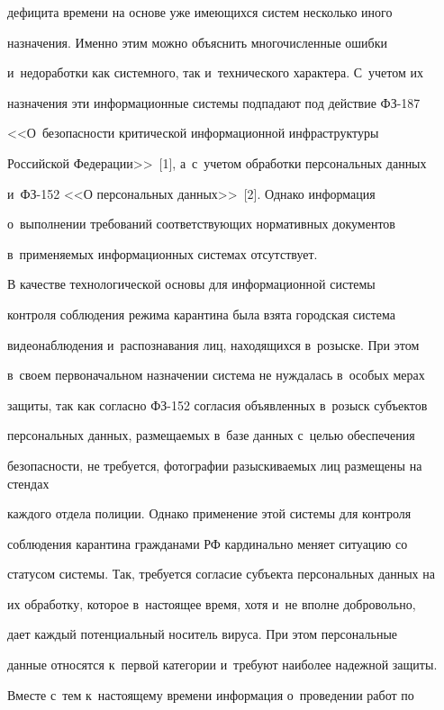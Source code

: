 дефицита времени на основе уже имеющихся систем несколько иного 


назначения. Именно этим можно объяснить многочисленные ошибки 


и~недоработки как системного, так и~технического характера. С~учетом их 


назначения эти информационные системы подпадают под действие ФЗ-187 


<<О~безопас\-ности критической информационной инфраструктуры 


Российской Федерации>>~[1], а~с~учетом обработки персональных данных 


и~ФЗ-152 <<О персональных данных>>~[2]. Однако информация 


о~выполнении требований соответствующих нормативных документов 


в~применяемых информационных системах отсутствует. 


   


   В качестве технологической основы для информационной системы 


контроля соблюдения режима карантина была взята городская система 


видеонаблюдения и~распознавания лиц, находящихся в~розыске. При этом 


в~своем первоначальном назначении система не нуждалась в~особых мерах 


защиты, так как согласно ФЗ-152 согласия объявленных в~розыск субъектов 


персональных данных, размещаемых в~базе данных с~целью обеспечения 


безопасности, не требуется, фотографии разыскиваемых лиц размещены на стендах 


каждого отдела полиции. Однако применение этой системы для контроля 


соблюдения карантина гражданами РФ кардинально меняет ситуацию со 


статусом системы. Так, требуется согласие субъекта персональных данных на 


их обработку, которое в~настоящее время, хотя и~не вполне добровольно, 


дает каждый потенциальный носитель вируса. При этом персональные 


данные относятся к~первой категории и~требуют наиболее надежной защиты. 


Вместе с~тем к~настоящему времени информация о~проведении работ по 


